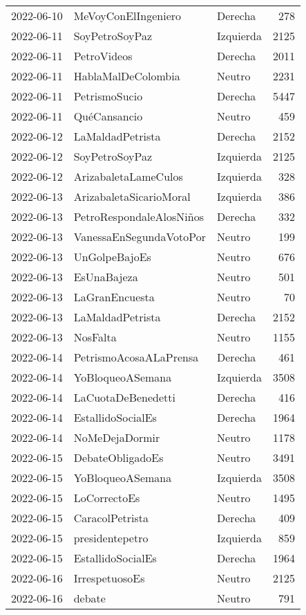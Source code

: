 \begin{longtable}{lllr}
2022-06-10 & MeVoyConElIngeniero & Derecha & 278 \\
2022-06-11 & SoyPetroSoyPaz & Izquierda & 2125 \\
2022-06-11 & PetroVideos & Derecha & 2011 \\
2022-06-11 & HablaMalDeColombia & Neutro & 2231 \\
2022-06-11 & PetrismoSucio & Derecha & 5447 \\
2022-06-11 & QuéCansancio & Neutro & 459 \\
2022-06-12 & LaMaldadPetrista & Derecha & 2152 \\
2022-06-12 & SoyPetroSoyPaz & Izquierda & 2125 \\
2022-06-12 & ArizabaletaLameCulos & Izquierda & 328 \\
2022-06-13 & ArizabaletaSicarioMoral & Izquierda & 386 \\
2022-06-13 & PetroRespondaleAlosNiños & Derecha & 332 \\
2022-06-13 & VanessaEnSegundaVotoPor & Neutro & 199 \\
2022-06-13 & UnGolpeBajoEs & Neutro & 676 \\
2022-06-13 & EsUnaBajeza & Neutro & 501 \\
2022-06-13 & LaGranEncuesta & Neutro & 70 \\
2022-06-13 & LaMaldadPetrista & Derecha & 2152 \\
2022-06-13 & NosFalta & Neutro & 1155 \\
2022-06-14 & PetrismoAcosaALaPrensa & Derecha & 461 \\
2022-06-14 & YoBloqueoASemana & Izquierda & 3508 \\
2022-06-14 & LaCuotaDeBenedetti & Derecha & 416 \\
2022-06-14 & EstallidoSocialEs & Derecha & 1964 \\
2022-06-14 & NoMeDejaDormir & Neutro & 1178 \\
2022-06-15 & DebateObligadoEs & Neutro & 3491 \\
2022-06-15 & YoBloqueoASemana & Izquierda & 3508 \\
2022-06-15 & LoCorrectoEs & Neutro & 1495 \\
2022-06-15 & CaracolPetrista & Derecha & 409 \\
2022-06-15 & presidentepetro & Izquierda & 859 \\
2022-06-15 & EstallidoSocialEs & Derecha & 1964 \\
2022-06-16 & IrrespetuosoEs & Neutro & 2125 \\
2022-06-16 & debate & Neutro & 791 \\

\end{longtable}
